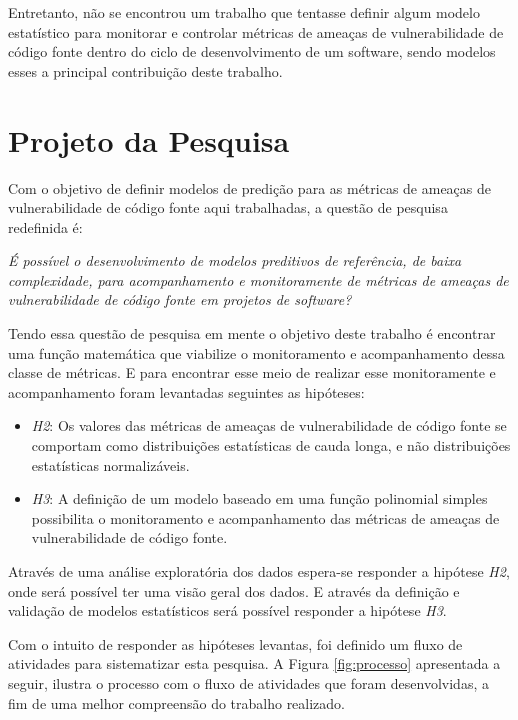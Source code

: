 Entretanto, não se encontrou um trabalho que tentasse definir algum modelo
estatístico para monitorar e controlar métricas de ameaças de vulnerabilidade de
código fonte dentro do ciclo de desenvolvimento de um software, sendo modelos
esses a principal contribuição deste trabalho.




\section{Projeto da Pesquisa}\label{metodologia:planejamentopesquisa}

Com o objetivo de definir modelos de predição para as métricas de ameaças de
vulnerabilidade de código fonte aqui trabalhadas, a questão de pesquisa
redefinida é:

\begin{center}
  \textit{É possível o desenvolvimento de modelos preditivos de referência, de
  baixa complexidade, para acompanhamento e monitoramente de métricas de ameaças
de vulnerabilidade de código fonte em projetos de software?}
\end{center}

Tendo essa questão de pesquisa em mente o objetivo deste trabalho é encontrar
uma função matemática que viabilize o monitoramento e acompanhamento dessa classe de
métricas. E para encontrar esse meio de realizar esse monitoramente e
acompanhamento foram levantadas seguintes as hipóteses:

\begin{itemize}\label{hipoteses2}
  \item \textit{H2}: Os valores das métricas de ameaças de vulnerabilidade de
    código fonte se comportam como distribuições estatísticas de cauda longa, e
    não distribuições estatísticas normalizáveis.

  \item \textit{H3}: A definição de um modelo baseado em uma função polinomial
   simples possibilita o monitoramento e acompanhamento das métricas de ameaças
   de vulnerabilidade de código fonte.
\end{itemize}

Através de uma análise exploratória dos dados espera-se responder a hipótese
\textit{H2}, onde será possível ter uma visão geral dos dados. E através da
definição e validação de modelos estatísticos será possível responder a hipótese
\textit{H3}.

Com o intuito de responder as hipóteses levantas, foi definido um fluxo de
atividades para sistematizar esta pesquisa. A Figura \ref{fig:processo}
apresentada a seguir, ilustra o processo com o fluxo de atividades que foram
desenvolvidas, a fim de uma melhor compreensão do trabalho realizado.

